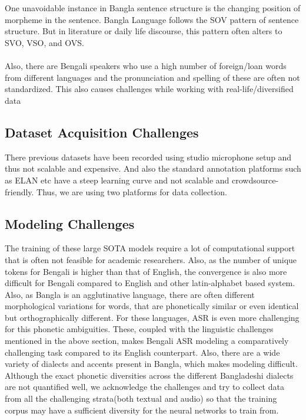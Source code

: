 \\\\
One unavoidable instance in Bangla sentence structure is the changing position of morpheme in the sentence. Bangla Language follows the SOV pattern of sentence structure. But in literature or daily life discourse, this pattern often alters to SVO, VSO, and OVS. \cite{abAbul2015} \cite{BBkotha2014}
\\\\
Also, there are Bengali speakers who use a high number of foreign/loan words from different languages and the pronunciation and spelling of these are often not standardized. This also causes challenges while working with real-life/diversified data \cite{roy1969some}

\subsection{Dataset Acquisition Challenges}

There previous datasets have been recorded using studio microphone setup and thus not scalable and expensive. And also the standard annotation platforms such as ELAN etc have a steep learning curve and not scalable and crowdsource-friendly. Thus, we are using two platforms for data collection. 

\subsection{Modeling Challenges}

The training of these large SOTA models require a lot of computational support that is often not feasible for academic researchers. Also, as the number of unique tokens for Bengali is higher than that of English, the convergence is also more difficult for Bengali compared to English and other latin-alphabet based system. Also, as Bangla is an agglutinative language, there are often different morphological variations for words, that are phonetically similar or even identical but orthographically different. For these languages, ASR is even more challenging for this phonetic ambiguities. These, coupled with the linguistic challenges mentioned in the above section, makes Bengali ASR modeling a comparatively challenging task compared to its English counterpart. Also, there are a wide variety of dialects and accents present in Bangla, which makes modeling difficult. Although the exact phonetic diversities across the different Bangladeshi dialects are not quantified well, we acknowledge the challenges and try to collect data from all the challenging strata(both textual and audio) so that the training corpus may have a sufficient diversity for the neural networks to train from.

